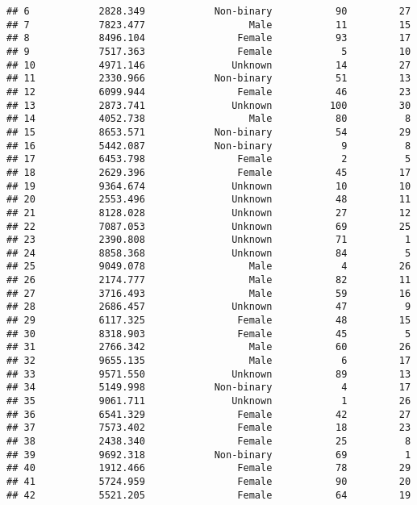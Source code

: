 \documentclass[
]{article}
\begin{document}
\begin{verbatim}
## 6            2828.349            Non-binary           90         27
## 7            7823.477                  Male           11         15
## 8            8496.104                Female           93         17
## 9            7517.363                Female            5         10
## 10           4971.146               Unknown           14         27
## 11           2330.966            Non-binary           51         13
## 12           6099.944                Female           46         23
## 13           2873.741               Unknown          100         30
## 14           4052.738                  Male           80          8
## 15           8653.571            Non-binary           54         29
## 16           5442.087            Non-binary            9          8
## 17           6453.798                Female            2          5
## 18           2629.396                Female           45         17
## 19           9364.674               Unknown           10         10
## 20           2553.496               Unknown           48         11
## 21           8128.028               Unknown           27         12
## 22           7087.053               Unknown           69         25
## 23           2390.808               Unknown           71          1
## 24           8858.368               Unknown           84          5
## 25           9049.078                  Male            4         26
## 26           2174.777                  Male           82         11
## 27           3716.493                  Male           59         16
## 28           2686.457               Unknown           47          9
## 29           6117.325                Female           48         15
## 30           8318.903                Female           45          5
## 31           2766.342                  Male           60         26
## 32           9655.135                  Male            6         17
## 33           9571.550               Unknown           89         13
## 34           5149.998            Non-binary            4         17
## 35           9061.711               Unknown            1         26
## 36           6541.329                Female           42         27
## 37           7573.402                Female           18         23
## 38           2438.340                Female           25          8
## 39           9692.318            Non-binary           69          1
## 40           1912.466                Female           78         29
## 41           5724.959                Female           90         20
## 42           5521.205                Female           64         19

\end{verbatim}
\end{document}
